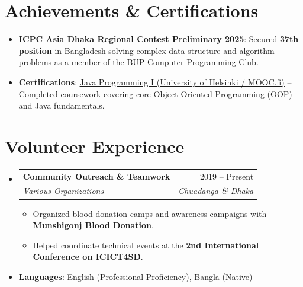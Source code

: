 \documentclass[letterpaper,11pt]{article}
\makeatletter
\newcommand{\resumeItem}[1]{
  \item\small{
    {#1 \vspace{-2pt}}
  }
}
\newcommand{\resumeSubheading}[4]{
  \vspace{1pt}\item
    \begin{tabularx}{\linewidth}{@{}X@{\hspace{10pt}}r@{}}
      \textbf{#1} & #2 \\
      \textit{\small#3} & \textit{\small #4} \\
    \end{tabularx}\vspace{-3pt} 
}
\newcommand{\resumeSubHeadingListStart}{\begin{itemize}[leftmargin=0.15in, label={}, itemsep=3pt, topsep=1pt]}
\newcommand{\resumeSubHeadingListEnd}{\end{itemize}}
\newcommand{\resumeItemListStart}{\begin{itemize}[noitemsep, topsep=1pt, parsep=0pt, partopsep=0pt]}
\newcommand{\resumeItemListEnd}{\end{itemize}\vspace{-3pt}}
\makeatother
\begin{document}
\section{Achievements \& Certifications}
 \begin{itemize}[leftmargin=0.15in, label={}, noitemsep, topsep=0pt]
    \item \small{
     \textbf{ICPC Asia Dhaka Regional Contest Preliminary 2025}{: Secured \textbf{37th position} in Bangladesh solving complex data structure and algorithm problems as a member of the BUP Computer Programming Club.}
    }
    \item \small{
     \textbf{Certifications}{: \href{https://certificates.mooc.fi/validate/gnj0bv5ff9c}{\underline{Java Programming I (University of Helsinki / MOOC.fi)}} -- Completed coursework covering core Object-Oriented Programming (OOP) and Java fundamentals.}
    }
 \end{itemize}

\section{Volunteer Experience}
  \resumeSubHeadingListStart
    \resumeSubheading{Community Outreach \& Teamwork}{2019 -- Present}{Various Organizations}{Chuadanga \& Dhaka}
      \resumeItemListStart
        \resumeItem{Organized blood donation camps and awareness campaigns with \textbf{Munshigonj Blood Donation}.}
        \resumeItem{Helped coordinate technical events at the \textbf{2nd International Conference on ICICT4SD}.}
      \resumeItemListEnd
  \resumeSubHeadingListEnd

 \begin{itemize}[leftmargin=0.15in, label={}, noitemsep, topsep=2pt]
    \item \small{\textbf{Languages}{: English (Professional Proficiency), Bangla (Native)}}
 \end{itemize}

\end{document}
